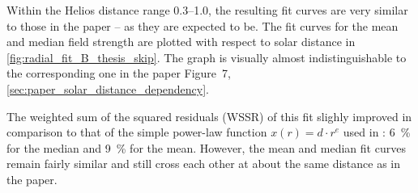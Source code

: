 %
Within the Helios distance range \SIrange{0.3}{1.0}{\au}, the resulting fit curves are very similar to those in the paper -- as they are expected to be. The fit curves for the mean and median field strength are plotted with respect to solar distance in \autoref{fig:radial_fit_B_thesis_skip}. The graph is visually almost indistinguishable to the corresponding one in the paper Figure~7, \autoref{sec:paper_solar_distance_dependency}.
\begin{figure}[htb]
\end{figure}

The weighted sum of the squared residuals (WSSR) of this fit slighly improved in comparison to that of the simple power-law function $x(r) = d \cdot r^e$ used in \citet{Venzmer2018}: \SI{6}{\%} for the median and \SI{9}{\%} for the mean. However, the mean and median fit curves remain fairly similar and still cross each other at about the same distance as in the paper.

